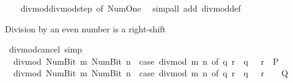 \begin{isabellebody}
%
\isadelimproof
\ \ %
\endisadelimproof
%
\isatagproof
{}\isamarkupfalse%
\ divmod{\isacharunderscore}{\kern0pt}divmod{\isacharunderscore}{\kern0pt}step\ {\isacharbrackleft}{\kern0pt}of\ {\isachardoublequoteopen}Num{\isachardot}{\kern0pt}One{\isachardoublequoteclose}{\isacharbrackright}{\kern0pt}\ \isamarkupfalse%
\ {\isacharparenleft}{\kern0pt}simp{\isacharunderscore}{\kern0pt}all\ add{\isacharcolon}{\kern0pt}\ divmod{\isacharunderscore}{\kern0pt}def{\isacharparenright}{\kern0pt}%
\endisatagproof
{\isafoldproof}%
%
\isadelimproof
%
\endisadelimproof
%
\begin{isamarkuptext}%
Division by an even number is a right-shift%
\end{isamarkuptext}\isamarkuptrue%
\isamarkupfalse%
\ divmod{\isacharunderscore}{\kern0pt}cancel\ {\isacharbrackleft}{\kern0pt}simp{\isacharbrackright}{\kern0pt}{\isacharcolon}{\kern0pt}\isanewline
\ \ {\isachardoublequoteopen}divmod\ {\isacharparenleft}{\kern0pt}Num{\isachardot}{\kern0pt}Bit{}\ m{\isacharparenright}{\kern0pt}\ {\isacharparenleft}{\kern0pt}Num{\isachardot}{\kern0pt}Bit{}\ n{\isacharparenright}{\kern0pt}\ {\isacharequal}{\kern0pt}\ {\isacharparenleft}{\kern0pt}case\ divmod\ m\ n\ of\ {\isacharparenleft}{\kern0pt}q{\isacharcomma}{\kern0pt}\ r{\isacharparenright}{\kern0pt}\ {\isasymRightarrow}\ {\isacharparenleft}{\kern0pt}q{\isacharcomma}{\kern0pt}\ {}\ {\isacharasterisk}{\kern0pt}\ r{\isacharparenright}{\kern0pt}{\isacharparenright}{\kern0pt}{\isachardoublequoteclose}\ {\isacharparenleft}{\kern0pt}\ {\isacharquery}{\kern0pt}P{\isacharparenright}{\kern0pt}\isanewline
\ \ {\isachardoublequoteopen}divmod\ {\isacharparenleft}{\kern0pt}Num{\isachardot}{\kern0pt}Bit{}\ m{\isacharparenright}{\kern0pt}\ {\isacharparenleft}{\kern0pt}Num{\isachardot}{\kern0pt}Bit{}\ n{\isacharparenright}{\kern0pt}\ {\isacharequal}{\kern0pt}\ {\isacharparenleft}{\kern0pt}case\ divmod\ m\ n\ of\ {\isacharparenleft}{\kern0pt}q{\isacharcomma}{\kern0pt}\ r{\isacharparenright}{\kern0pt}\ {\isasymRightarrow}\ {\isacharparenleft}{\kern0pt}q{\isacharcomma}{\kern0pt}\ {}\ {\isacharasterisk}{\kern0pt}\ r\ {\isacharplus}{\kern0pt}\ {}{\isacharparenright}{\kern0pt}{\isacharparenright}{\kern0pt}{\isachardoublequoteclose}\ {\isacharparenleft}{\kern0pt}\ {\isacharquery}{\kern0pt}Q{\isacharparenright}{\kern0pt}\isanewline
%
\isadelimproof
%
\endisadelimproof
%
\isatagproof
{}\isamarkupfalse%
\ {\isacharminus}{\kern0pt}\isanewline

\end{isabellebody}
